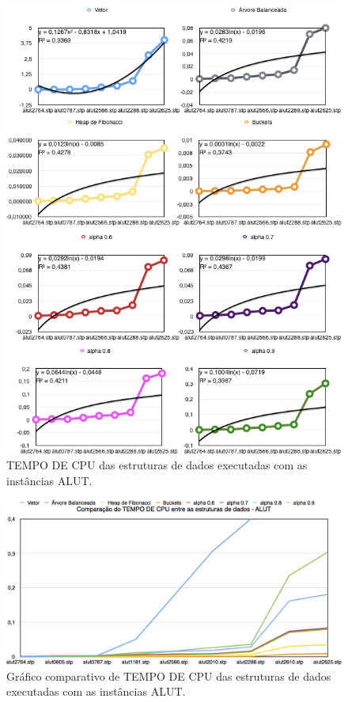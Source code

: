 \documentclass[
	12pt,				%
	oneside,			%
	a4paper,			%
	english,			%
	french,				%
	spanish,			%
	brazil,				%
	]{abntex2}
\begin{document}
\begin{figure}[H]
 \centering
 \includegraphics[width=6.4in]{charts/cpu_all_alut.png}
 \caption{TEMPO DE CPU das estruturas de dados executadas com as instâncias ALUT.}
 \label{fig:AlutGraphTime}
\end{figure}

\begin{figure}[H]
 \centering
 \includegraphics[width=6.4in]{charts/comp_ed_alut.png}
 \caption{Gráfico comparativo de TEMPO DE CPU das estruturas de dados executadas com as instâncias ALUT.}
 \label{fig:AlutGraphTimeAll}
\end{figure}
\end{document}
